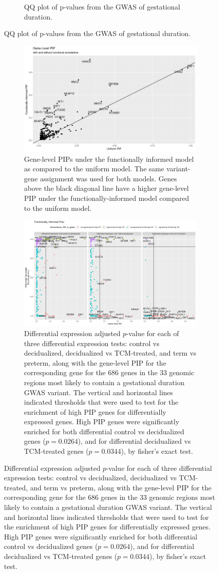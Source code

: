 \begin{figure}
\begin{subfigure}[t]{\textwidth}
    \caption{QQ plot of p-values from the GWAS of gestational duration.}\label{fig:qqplot}
  \end{subfigure}
\end{figure}


\begin{figure}
  \centering
  \begin{subfigure}[t]{\textwidth}
    \centering
    \includegraphics[width=\linewidth]{img/null-gene-gene-comp.png}
    \caption{Gene-level PIPs under the functionally informed model as compared to the uniform model.  The same variant-gene assignment was used for both models.  Genes above the black diagonal line have a higher gene-level PIP under the functionally-informed model compared to the uniform model.  }\label{fig:univ_assoc}
  \end{subfigure}
    \begin{subfigure}[t]{\textwidth}
    \centering
    \includegraphics[width=\linewidth]{img/de-gwas-comp.png}
    \caption{Differential expression adjusted $p$-value for each of three differential expression tests: control vs decidualized, decidualized vs TCM-treated, and term vs preterm, along with the gene-level PIP for the corresponding gene for the 686 genes in the 33 genomic regions most likely to contain a gestational duration GWAS variant.  The vertical and horizontal lines indicated thresholds that were used to test for the enrichment of high PIP genes for differentially expressed genes. High PIP genes were significantly enriched for both differential control vs decidualized genes ($p=0.0264$), and for differential decidualized vs TCM-treated genes ($p=0.0344$), by fisher's exact test.}\label{fig:multiv_assoc}

\end{subfigure}
\end{figure}
